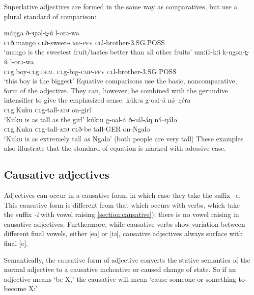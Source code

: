 Superlative adjectives are formed in the same way as comparatives, but use a plural standard of comparison:

\ea 
	\ea \gll máŋga 	ð-ɜɲəl-t̪-ú 			l-orə-wa	\\
		\textsc{cl}ð.mango 	\textsc{cl}ð-sweet-\textsc{cmp}-\textsc{pfv}	\textsc{cl}l-brother-3.SG.POSS\\
		\glt ‘mango is the sweetest fruit/tastes better than all other fruits’
	\ex	\gll umːiə́-kːi 		k-ugən-t̪-ú 			l-orə-wa\\
		 	\textsc{cl}g.boy-\textsc{cl}g.\textsc{dem}.	\textsc{cl}g-big-\textsc{cmp}-\textsc{pfv}	\textsc{cl}l-brother-3.SG.POSS\\
		\glt ‘this boy is the biggest’
\z \z 
Equative comparisons use the basic, noncomparative, form of the adjective. They can, however, be combined with the gerundive intensifier to give the emphasized sense.
\ea 
	\ea \gll kúk:u 	g-oal-á 		nə́--ŋéɾa \\
			\textsc{cl}g.Kuku	\textsc{cl}g-tall-\textsc{adj}	on-girl	\\
		\glt ‘Kuku is as tall as the girl’
	\ex \gll kúk:u 	g-oal-á 	ð-oál-áŋ 	nə́--ŋálo	\\
			\textsc{cl}g.Kuku	\textsc{cl}g-tall-\textsc{adj}	\textsc{cl}ð-be tall-GER	on-Ngalo	\\
		\glt ‘Kuku is as extremely tall as Ngalo’ (both people are very tall)
\z \z 
These examples also illustrate that the standard of equation is marked with adessive case.%


\subsection{Causative adjectives}\label{sec:ch10:causadj}

Adjectives can occur in a causative form, in which case they take the suffix \textit{-e}. This causative form is different from that which occurs with verbs, which take the suffix \textit{-i} with vowel raising \ref{section:causative}); there is no vowel raising in causative adjectives. Furthermore, while causative verbs show variation between different final vowels, either [eə] or [iə], causative adjectives always surface with final [e].

Semantically, the causative form of adjective converts the stative semantics of the normal adjective to a causative inchoative or caused change of state. So if an adjective means `be X,' the causative will mean `cause someone or something to become X:'

